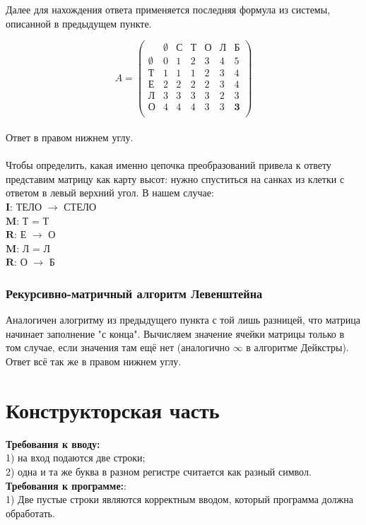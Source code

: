\documentclass[12pt,a4paper]{article}
\begin{document}
Далее для нахождения ответа применяется последняя формула из системы, описанной в предыдущем пункте.

\begin{equation*}
A = \left(
\begin{array}{ccccccc}
& \emptyset & \text{С} & \text{Т} & \text{О} & \text{Л} & \text{Б}\\
\emptyset & 0 & 1 & 2 & 3 & 4 & 5\\
\text{Т} & 1 & 1 & 1 & 2 & 3 & 4 \\ 
\text{Е} & 2 & 2 & 2 & 2 & 3 & 4 \\
\text{Л} & 3 & 3 & 3 & 3 & 2 & 3 \\
\text{О} & 4 & 4 & 4 & 3 & 3 & \textbf{3} \\
\end{array}
\right)
\end{equation*}
\\
Ответ в правом нижнем углу.\\
\\
Чтобы определить, какая именно цепочка преобразований привела к ответу представим матрицу как карту высот: нужно спуститься на санках из клетки с ответом в левый верхний угол. В нашем случае:\\
$\textbf{I}$: ТЕЛО $\rightarrow$ СТЕЛО\\
$\textbf{M}$: Т = Т\\
$\textbf{R}$: Е $\rightarrow$ О\\
$\textbf{M}$: Л = Л\\
$\textbf{R}$: О $\rightarrow$ Б\\


\subsubsection{Рекурсивно-матричный алгоритм Левенштейна}
Аналогичен алогритму из предыдущего пункта с той лишь разницей, что матрица начинает заполнение "с конца". Вычисляем значение ячейки матрицы только в том случае, если значения там ещё нет (аналогично $\infty$ в алгоритме Дейкстры). Ответ всё так же в правом нижнем углу.

\section{Конструкторская часть}
\textbf{Требования к вводу:}\\
1) на вход подаются две строки;\\
2) одна и та же буква в разном регистре считается как разный символ.\\
\textbf{Требования к программе:}:\\
1) Две пустые строки являются корректным вводом, который программа должна обработать.
\clearpage
\end{document}
